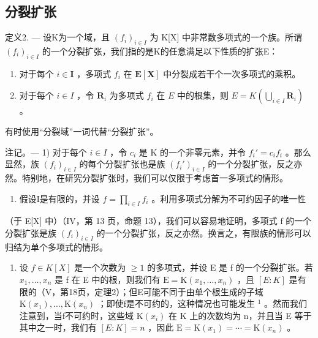 \subsection{分裂扩张}

定义2. --- 设K为一个域，且 \((f_{i})_{i\in I}\) 为 K{[}X{]} 中非常数多项式的一个族。所谓 \((f_{i})_{i\in I}\) 的一个分裂扩张，我们指的是K的任意满足以下性质的扩张E：

\begin{enumerate}
\def\labelenumi{\alph{enumi})}
\item
  对于每个 \(i \in \mathbf{I}\) ，多项式 \(f_i\) 在 \(\mathbf{E}[\mathbf{X}]\) 中分裂成若干个一次多项式的乘积。
\item
  对于每个 \(i \in I\) ，令 \(\mathbf{R}_i\) 为多项式 \(f_i\) 在 \(E\) 中的根集，则 \(E = K\left(\bigcup_{i \in I} \mathbf{R}_i\right)\) 。
\end{enumerate}

有时使用“分裂域”一词代替“分裂扩张”。

注记。--- 1) 对于每个 \(i \in I\) ，令 \(c_i\) 是 K 的一个非零元素，并令 \(f_i' = c_i f_i\) 。那么显然，族 \((f_i)_{i \in I}\) 的每个分裂扩张也是族 \((f_i')_{i \in I}\) 的一个分裂扩张，反之亦然。特别地，在研究分裂扩张时，我们可以仅限于考虑首一多项式的情形。

\begin{enumerate}
\def\labelenumi{\arabic{enumi})}
\setcounter{enumi}{1}
\tightlist
\item
  假设I是有限的，并设 \(f = \prod_{i \in I} f_i\) 。利用多项式分解为不可约因子的唯一性
\end{enumerate}

（于 E{[}X{]} 中）（IV，第 13 页，命题 13），我们可以容易地证明，多项式 f 的一个分裂扩张是族 \((f_{i})_{i \in I}\) 的一个分裂扩张，反之亦然。换言之，有限族的情形可以归结为单个多项式的情形。

\begin{enumerate}
\def\labelenumi{\arabic{enumi})}
\setcounter{enumi}{2}
\tightlist
\item
  设 \(f \in K[X]\) 是一个次数为 \(\geqslant 1\) 的多项式，并设 E 是 f 的一个分裂扩张。若 \(x_{1}, \ldots, x_{n}\) 是 f 在 E 中的根，则我们有 \(\mathrm{E} = \mathrm{K}(x_{1}, \ldots, x_{n})\) ，且 \([E : K]\) 是有限的（V，第18页，定理2）；但E可能不同于由单个根生成的子域 \(\mathrm{K}(x_{1}), \ldots, \mathrm{K}(x_{n})\) ；即使f是不可约的，这种情况也可能发生 \(^{1}\) 。然而我们注意到，当f不可约时，这些域 \(\mathrm{K}(x_{i})\) 在 K 上的次数均为 n，并且当 E 等于其中之一时，我们有 \([E : K] = n\) ，因此 \(\mathrm{E} = \mathrm{K}(x_{1}) = \cdots = \mathrm{K}(x_{n})\) 。
\end{enumerate}

